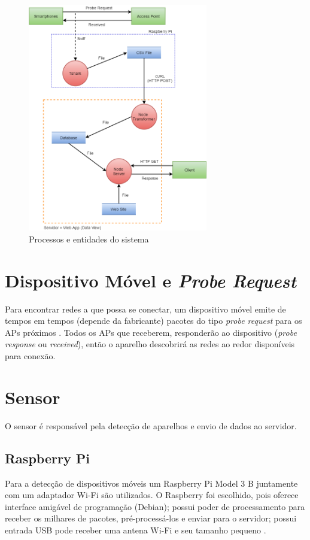 \begin{figure}[!h]
  \caption{\label{diagrama-fluxo}Processos e entidades do sistema}
  \begin{center}
    \includegraphics[width=0.70\textwidth]{img/diagrama_fluxo.png}
  \end{center}
\end{figure}

\section{Dispositivo Móvel e \emph{Probe Request}}
\label{smartphone-probe}
Para encontrar redes a que possa se conectar, um dispositivo móvel emite de tempos em tempos (depende da fabricante) pacotes do tipo \emph{probe request} para os APs próximos \cite{Meraki}. Todos os APs que receberem, responderão ao dispositivo (\emph{probe response} ou \emph{received}), então o aparelho descobrirá as redes ao redor disponíveis para conexão.

\section{Sensor}
O sensor é responsável pela detecção de aparelhos e envio de dados ao servidor.

\subsection{Raspberry Pi}
Para a detecção de dispositivos móveis um Raspberry Pi Model 3 B juntamente com um adaptador Wi-Fi são utilizados. O Raspberry foi escolhido,
pois oferece interface amigável de programação (Debian); possui poder de processamento para receber os milhares de pacotes, pré-processá-los
e enviar para o servidor; possui entrada USB pode receber uma antena Wi-Fi e seu tamanho pequeno \cite{rpi2017}. 

